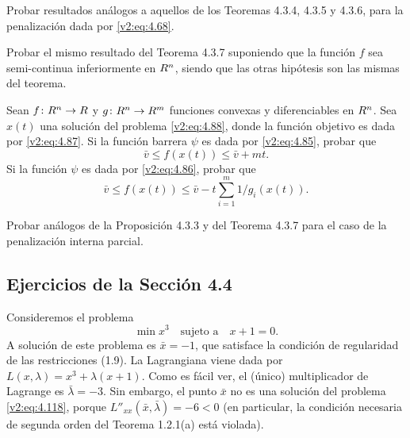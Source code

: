 \begin{exercise}\label{v2:ejer:4.3.6}
    Probar resultados análogos a aquellos de los Teoremas 4.3.4, 4.3.5 y 4.3.6, para la penalización dada por \eqref{v2:eq:4.68}.
\end{exercise}

\begin{exercise}\label{v2:ejer:4.3.7}
    Probar el mismo resultado del Teorema 4.3.7 suponiendo que la función $f$ sea semi-continua inferiormente en $R^n$, siendo que las otras hipótesis son las mismas del teorema.
\end{exercise}

\begin{exercise}\label{v2:ejer:4.3.8}
    Sean $f \colon R^n \to R$ y $g \colon R^n \to R^m$ funciones convexas y diferenciables en $R^n$. Sea $x(t)$ una solución del problema \eqref{v2:eq:4.88}, donde la función objetivo es dada por \eqref{v2:eq:4.87}.
    Si la función barrera $\psi$ es dada por \eqref{v2:eq:4.85}, probar que
    \[
        \bar{v} \le f(x(t)) \le \bar{v} + mt.
    \]
    Si la función $\psi$ es dada por \eqref{v2:eq:4.86}, probar que
    \[
        \bar{v} \le f(x(t)) \le \bar{v} - t \sum_{i=1}^m 1/g_i(x(t)).
    \]
\end{exercise}

\begin{exercise}\label{v2:ejer:4.3.9}
    Probar análogos de la Proposición 4.3.3 y del Teorema 4.3.7 para el caso de la penalización interna parcial.
\end{exercise}

\subsection*{Ejercicios de la Sección 4.4}

\begin{exercise}\label{v2:ejer:4.4.1}
    Consideremos el problema
    \[
        \min x^3 \quad \text{sujeto a} \quad x + 1 = 0.
    \]
    A solución de este problema es $\bar{x} = -1$, que satisface la condición de regularidad de las restricciones (1.9). La Lagrangiana viene dada por $L(x, \lambda) = x^3 + \lambda(x + 1)$. Como es fácil ver, el (único) multiplicador de Lagrange es $\bar{\lambda} = -3$.
    Sin embargo, el punto $\bar{x}$ no es una solución del problema \eqref{v2:eq:4.118}, porque $L''_{xx}(\bar{x}, \bar{\lambda}) = -6 < 0$ (en particular, la condición necesaria de segunda orden del Teorema 1.2.1(a) está violada).
\end{exercise}

